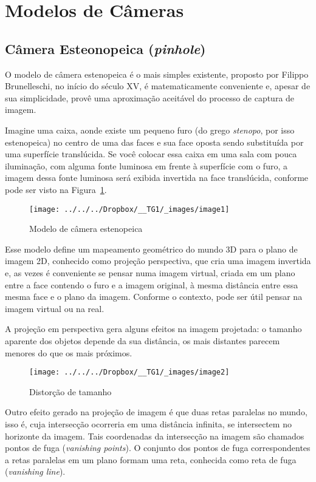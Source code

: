 \documentclass[ecp,tc]{iiufrgs}
\begin{document}
\section{Modelos de Câmeras}

\subsection{Câmera Esteonopeica (\textit{pinhole})}
O  modelo  de  câmera  estenopeica  é  o  mais  simples  existente,  proposto  por  Filippo Brunelleschi, no início do século XV, é matematicamente conveniente e, apesar de sua simplicidade, provê uma aproximação aceitável do processo de captura de imagem.

Imagine uma caixa, aonde existe um pequeno furo (do grego \textit{stenopo}, por isso estenopeica) no centro de uma das faces e sua face oposta sendo substituída por uma superfície translúcida. Se você colocar essa caixa em uma sala com pouca iluminação, com alguma fonte luminosa em frente à superfície com o furo, a imagem dessa fonte luminosa será exibida invertida na face translúcida, conforme pode ser visto na Figura~\ref{fig:image1}.

\begin{figure}
\centering
\caption{Modelo de câmera estenopeica}
\texttt{[image: ../../../Dropbox/\_\_TG1/\_images/image1]}
\label{fig:image1}
\end{figure}

Esse modelo define um mapeamento geométrico do mundo 3D para o plano de imagem 2D, conhecido como projeção perspectiva, que cria uma imagem invertida e, as vezes é conveniente se pensar numa imagem virtual, criada em um plano entre a face contendo o furo e a imagem original, à mesma distância entre essa mesma face e o plano da imagem. Conforme o contexto, pode ser útil pensar na imagem virtual ou na real.

A projeção em perspectiva gera alguns efeitos na imagem projetada: o tamanho aparente dos objetos depende da sua distância, os mais distantes parecem menores do que os mais próximos.

\begin{figure}
	\centering
	\caption{Distorção de tamanho}
	\texttt{[image: ../../../Dropbox/\_\_TG1/\_images/image2]}
	\label{fig:image2}
\end{figure}

Outro efeito gerado na projeção de imagem é que duas retas paralelas no mundo, isso é, cuja intersecção ocorreria em uma distância infinita, se intersectem no horizonte da imagem. Tais coordenadas da intersecção na imagem são chamados pontos de fuga (\textit{vanishing points}). O conjunto dos pontos de fuga correspondentes a retas paralelas em um plano formam uma reta, conhecida como reta de fuga (\textit{vanishing line}).
\end{document}

